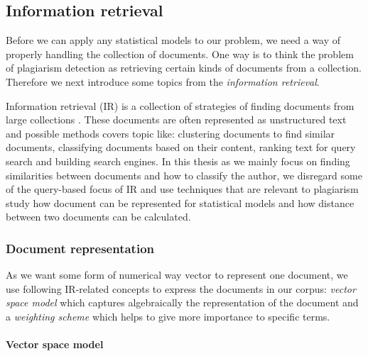 

\subsection{Information retrieval} \label{chap-IR}

Before we can apply any statistical models to our problem, we need a way of properly handling the collection of documents. One way is to think the problem of plagiarism detection as retrieving certain kinds of documents from a collection. Therefore we next introduce some topics from the \emph{information retrieval}.

Information retrieval (IR) is a collection of strategies of finding documents from large collections \cite{Manning:2008:IIR:1394399}. These documents are often represented as unstructured text and possible methods covers topic like: clustering documents to find similar documents, classifying documents based on their content, ranking text for query search and building search engines. In this thesis as we mainly focus on finding similarities between documents and how to classify the author, we disregard some of the query-based focus of IR and use techniques that are relevant to plagiarism study \ie how document can be represented for statistical models and how distance between two documents can be calculated.




\subsubsection{Document representation} \label{chap-IR-document-repr}

As we want some form of numerical way \ie vector to represent one document, we use following IR-related concepts to express the documents in our corpus: \emph{vector space model} which captures algebraically the representation of the document and a \emph{weighting scheme} which helps to give more importance to specific terms.


\paragraph{Vector space model}

